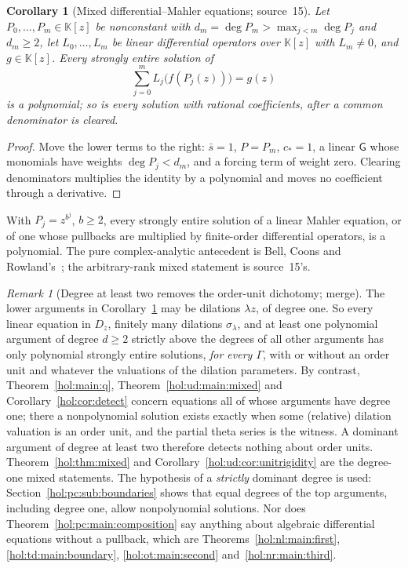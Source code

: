 \documentclass[11pt]{article}
\numberwithin{equation}{section}
\newtheorem{corollary}[theorem]{Corollary}
\theoremstyle{definition}
\theoremstyle{remark}
\newtheorem{remark}[theorem]{Remark}
\newcommand{\KK}{\mathbb K}
\begin{document}
\begin{corollary}[Mixed differential--Mahler equations; source~15]
\label{hol:pc:cor:linear}
Let $P_0,\ldots,P_m\in\KK[z]$ be nonconstant with $d_m=\deg P_m>\max_{j<m}\deg
P_j$ and $d_m\ge2$, let $L_0,\ldots,L_m$ be linear differential operators over
$\KK[z]$ with $L_m\ne0$, and $g\in\KK[z]$. Every strongly entire solution of
\begin{equation}\label{hol:pc:eq:linear}
 \sum_{j=0}^mL_j\bigl(f(P_j(z))\bigr)=g(z)
\end{equation}
is a polynomial; so is every solution with rational coefficients, after a
common denominator is cleared.
\end{corollary}

\begin{proof}
Move the lower terms to the right: $\bar s=1$, $P=P_m$, $c_*=1$, a linear
$\mathsf G$ whose monomials have weights $\deg P_j<d_m$, and a forcing term of
weight zero. Clearing denominators multiplies the identity by a polynomial and
moves no coefficient through a derivative.
\end{proof}

With $P_j=z^{b^j}$, $b\ge2$, every strongly entire solution of a linear Mahler
equation, or of one whose pullbacks are multiplied by finite-order
differential operators, is a polynomial. The pure complex-analytic
antecedent is Bell, Coons and Rowland's~\cite[Lemma~6]{bcr}; the arbitrary-rank
mixed statement is source~15's.

\begin{remark}[Degree at least two removes the order-unit dichotomy; merge]
\label{hol:pc:rem:dichotomy}
The lower arguments in Corollary~\ref{hol:pc:cor:linear} may be dilations
$\lambda z$, of degree one. So every linear equation in $D_z$, finitely many
dilations $\sigma_\lambda$, and at least one polynomial argument of degree
$d\ge2$ strictly above the degrees of all other arguments has only polynomial
strongly entire solutions, \emph{for every $\Gamma$}, with or without an order
unit and whatever the valuations of the dilation parameters. By contrast,
Theorem~\ref{hol:main:q}, Theorem~\ref{hol:ud:main:mixed} and
Corollary~\ref{hol:cor:detect} concern equations all of whose arguments have
degree one; there a nonpolynomial solution exists exactly when some
(relative) dilation valuation is an order unit, and the partial theta series
is the witness. A dominant argument of degree at least two therefore detects
nothing about order units. Theorem~\ref{hol:thm:mixed} and
Corollary~\ref{hol:ud:cor:unitrigidity} are the degree-one mixed statements. The
hypothesis of a \emph{strictly} dominant degree is used:
Section~\ref{hol:pc:sub:boundaries} shows that equal degrees of the top
arguments, including degree one, allow nonpolynomial solutions. Nor does
Theorem~\ref{hol:pc:main:composition} say anything about algebraic differential
equations without a pullback, which are Theorems~\ref{hol:nl:main:first},
\ref{hol:td:main:boundary}, \ref{hol:ot:main:second}
and~\ref{hol:nr:main:third}.
\end{remark}
\end{document}
